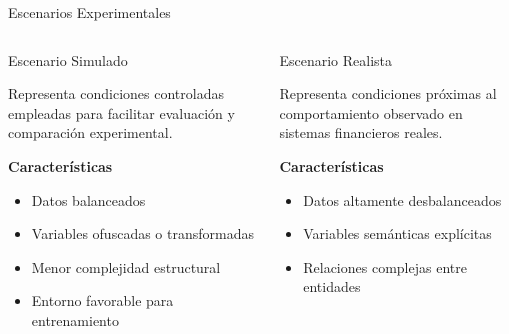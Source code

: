 \documentclass[aspectratio=169, 8pt]{beamer}
\begin{document}
\begin{frame}{Escenarios Experimentales}

\begin{columns}


\begin{block}{Escenario Simulado}

Representa condiciones controladas
empleadas para facilitar evaluación
y comparación experimental.

\vspace{0.1cm}

\textbf{Características}

\begin{itemize}

\item Datos balanceados

\item Variables ofuscadas o transformadas

\item Menor complejidad estructural

\item Entorno favorable para entrenamiento

\end{itemize}

\end{block}




\begin{block}{Escenario Realista}

Representa condiciones próximas
al comportamiento observado en
sistemas financieros reales.

\vspace{0.1cm}

\textbf{Características}

\begin{itemize}

\item Datos altamente desbalanceados

\item Variables semánticas explícitas

\item Relaciones complejas entre entidades


\end{itemize}
\end{block}
\end{columns}
\end{frame}
\end{document}
